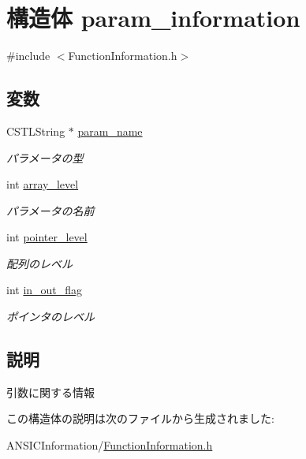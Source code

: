 \hypertarget{structparam__information}{
\section{構造体 param\_\-information}
\label{structparam__information}
}


{\ttfamily \#include $<$FunctionInformation.h$>$}

\subsection*{変数}
\begin{DoxyCompactItemize}
\item 
\hypertarget{structparam__information_a205ee85821326a29e5729bd911bf0561}{
CSTLString $\ast$ \hyperlink{structparam__information_a205ee85821326a29e5729bd911bf0561}{param\_\-name}}
\label{structparam__information_a205ee85821326a29e5729bd911bf0561}

\begin{DoxyCompactList}\small\item\em パラメータの型 \item\end{DoxyCompactList}\item 
\hypertarget{structparam__information_ac5e2a275c4e9848e2ad3a81937deda80}{
int \hyperlink{structparam__information_ac5e2a275c4e9848e2ad3a81937deda80}{array\_\-level}}
\label{structparam__information_ac5e2a275c4e9848e2ad3a81937deda80}

\begin{DoxyCompactList}\small\item\em パラメータの名前 \item\end{DoxyCompactList}\item 
\hypertarget{structparam__information_a19b6cd4d981eb0050622f0195bd173b0}{
int \hyperlink{structparam__information_a19b6cd4d981eb0050622f0195bd173b0}{pointer\_\-level}}
\label{structparam__information_a19b6cd4d981eb0050622f0195bd173b0}

\begin{DoxyCompactList}\small\item\em 配列のレベル \item\end{DoxyCompactList}\item 
\hypertarget{structparam__information_aed609e4d8cf941c7e83309dea078edab}{
int \hyperlink{structparam__information_aed609e4d8cf941c7e83309dea078edab}{in\_\-out\_\-flag}}
\label{structparam__information_aed609e4d8cf941c7e83309dea078edab}

\begin{DoxyCompactList}\small\item\em ポインタのレベル \item\end{DoxyCompactList}\end{DoxyCompactItemize}


\subsection{説明}
引数に関する情報 

この構造体の説明は次のファイルから生成されました:\begin{DoxyCompactItemize}
\item 
ANSICInformation/\hyperlink{FunctionInformation_8h}{FunctionInformation.h}\end{DoxyCompactItemize}

